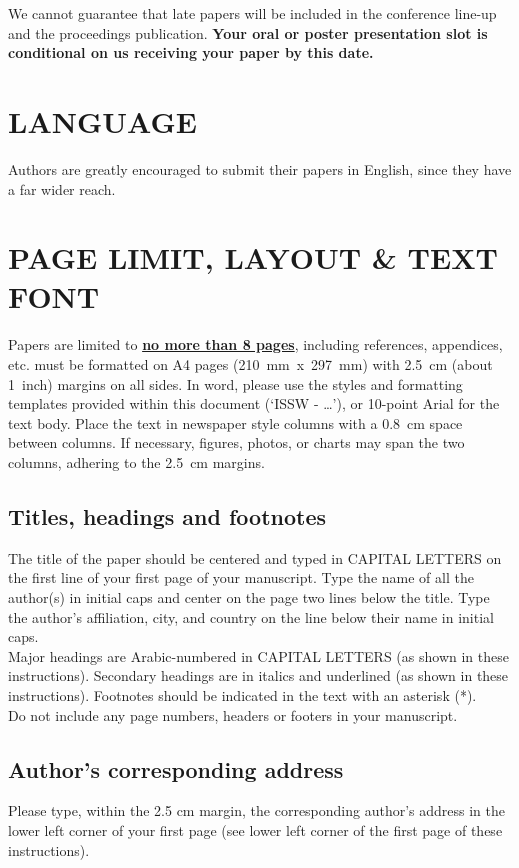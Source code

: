 \documentclass[3p,authoryear,times,twocolumn]{elsarticle_issw2018}
\begin{document}
\noindent
We cannot guarantee that late papers will be included in the conference line-up and the proceedings publication. \textbf{Your oral or poster presentation slot is conditional on us receiving your paper by this date.}
%
\section{LANGUAGE} 
Authors are greatly encouraged to submit their papers in English, since they have a far wider reach.
%
\section{PAGE LIMIT, LAYOUT \& TEXT FONT}
Papers are limited to \textbf{\underline{no more than 8 pages}}, including references, appendices, etc.  must be formatted on A4 pages (210 mm x 297 mm) with 2.5 cm (about 1 inch) margins on all sides. In word, please use the styles and formatting templates provided within this document (‘ISSW - …’), or 10-point Arial for the text body.
Place the text in newspaper style columns with a 0.8 cm space between columns. If necessary, figures, photos, or charts may span the two columns, adhering to the 2.5 cm margins.

%
\subsection{Titles, headings and footnotes}
The title of the paper should be centered and typed in CAPITAL LETTERS on the first line of your first page of your manuscript. Type the name of all the author(s) in initial caps and center on the page two lines below the title. Type the author's affiliation, city, and country on the line below their name in initial caps.\\
%

\noindent
Major headings are Arabic-numbered in CAPITAL LETTERS (as shown in these instructions). Secondary headings are in italics and underlined (as shown in these instructions). Footnotes should be indicated in the text with an asterisk (*).\\
%
\noindent
Do not include any page numbers, headers or footers in your manuscript.
%
\subsection{Author's corresponding address}
Please type, within the 2.5 cm margin, the corresponding author's address in the lower left corner of your first page (see lower left corner of the first page of these instructions).
%
\end{document}
